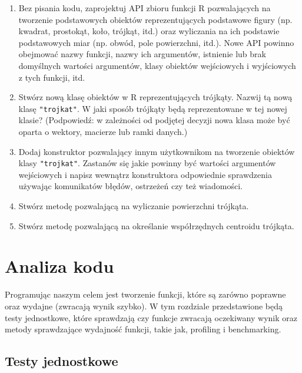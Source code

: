 \documentclass[paper=6in:9in,pagesize=pdftex,headinclude=on,footinclude=on,10pt]{scrbook}
\begin{document}
\begin{enumerate}
\def\labelenumi{\arabic{enumi})}
\item
  Bez pisania kodu, zaprojektuj API zbioru funkcji R pozwalających na tworzenie podstawowych obiektów reprezentujących podstawowe figury (np. kwadrat, prostokąt, koło, trójkąt, itd.) oraz wyliczania na ich podstawie podstawowych miar (np. obwód, pole powierzchni, itd.).
  Nowe API powinno obejmować nazwy funkcji, nazwy ich argumentów, istnienie lub brak domyślnych wartości argumentów, klasy obiektów wejściowych i wyjściowych z tych funkcji, itd.
\item
  Stwórz nową klasę obiektów w R reprezentujących trójkąty.
  Nazwij tą nową klasę \texttt{"trojkat"}.
  W jaki sposób trójkąty będą reprezentowane w tej nowej klasie?
  (Podpowiedź: w zależności od podjętej decyzji nowa klasa może być oparta o wektory, macierze lub ramki danych.)
\item
  Dodaj konstruktor pozwalający innym użytkownikom na tworzenie obiektów klasy \texttt{"trojkat"}.
  Zastanów się jakie powinny być wartości argumentów wejściowych i napisz wewnątrz konstruktora odpowiednie sprawdzenia używając komunikatów błędów, ostrzeżeń czy też wiadomości.
\item
  Stwórz metodę pozwalającą na wyliczanie powierzchni trójkąta.
\item
  Stwórz metodę pozwalającą na określanie współrzędnych centroidu trójkąta.
\end{enumerate}

\hypertarget{analiza-kodu}{%
\chapter{Analiza kodu}\label{analiza-kodu}}

Programując naszym celem jest tworzenie funkcji, które są zarówno poprawne oraz wydajne (zwracają wynik szybko).
W tym rozdziale przedstawione będą testy jednostkowe, które sprawdzają czy funkcje zwracają oczekiwany wynik oraz metody sprawdzające wydajność funkcji, takie jak, profiling i benchmarking.

\hypertarget{testy-jednostkowe}{%
\section{Testy jednostkowe}\label{testy-jednostkowe}}
\end{document}
